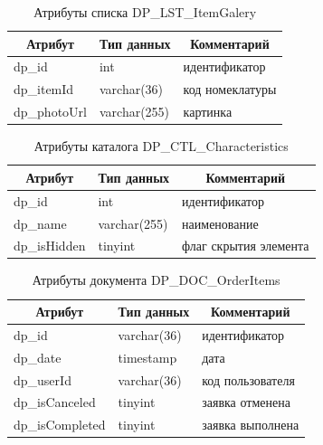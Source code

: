 \begin{table}[p]
    \centering\small

    \caption{Атрибуты списка DP\_LST\_ItemGalery}
    \label{tab:DP_LST_ItemGalery}

    \begin{tabular}{|p{5cm}|p{2.5cm}|p{9cm}|}
        \hline
        \multicolumn{1}{|c|}{Атрибут}
        & \multicolumn{1}{c|}{Тип данных}
        & \multicolumn{1}{c|}{Комментарий}
        \\ \hline

        dp\_id & int & идентификатор \\ \hline
        dp\_itemId & varchar(36) & код номеклатуры \\ \hline
        dp\_photoUrl & varchar(255) & картинка \\ \hline
    \end{tabular}
\end{table}

\begin{table}[p]
    \centering\small

    \caption{Атрибуты каталога DP\_CTL\_Characteristics}
    \label{tab:DP_CTL_Characteristics}

    \begin{tabular}{|p{5cm}|p{2.5cm}|p{9cm}|}
        \hline
        \multicolumn{1}{|c|}{Атрибут}
        & \multicolumn{1}{c|}{Тип данных}
        & \multicolumn{1}{c|}{Комментарий}
        \\ \hline

        dp\_id & int & идентификатор \\ \hline
        dp\_name & varchar(255) & наименование \\ \hline
        dp\_isHidden & tinyint & флаг скрытия элемента \\ \hline
    \end{tabular}
\end{table}

\begin{table}[p]
    \centering\small

    \caption{Атрибуты документа DP\_DOC\_OrderItems}
    \label{tab:DP_DOC_OrderItems}

    \begin{tabular}{|p{5cm}|p{2.5cm}|p{9cm}|}
        \hline
        \multicolumn{1}{|c|}{Атрибут}
        & \multicolumn{1}{c|}{Тип данных}
        & \multicolumn{1}{c|}{Комментарий}
        \\ \hline

        dp\_id & varchar(36) & идентификатор \\ \hline
        dp\_date & timestamp & дата \\ \hline
        dp\_userId & varchar(36) & код пользователя \\ \hline
        dp\_isCanceled & tinyint & заявка отменена \\ \hline
        dp\_isCompleted & tinyint & заявка выполнена \\ \hline
    \end{tabular}
\end{table}

